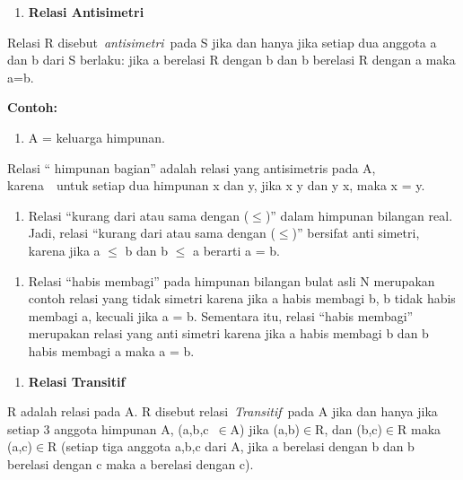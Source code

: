 \documentclass[11pt,fleqn]{book} %
\begin{document}
\noindent \textbf{}

\begin{enumerate}
\item \textbf{ Relasi Antisimetri}
\end{enumerate}

\noindent Relasi R disebut~\textit{antisimetri}~pada S jika dan hanya jika setiap dua anggota a dan b dari S berlaku: jika a berelasi R dengan b dan b berelasi R dengan a maka a=b.

\noindent \textbf{Contoh:}

\begin{enumerate}
\item \textbf{ }A = keluarga himpunan. 
\end{enumerate}

\noindent Relasi `` himpunan bagian'' adalah relasi yang antisimetris pada A, karena~~untuk setiap dua himpunan x dan y, jika x y dan y x, maka x = y.

\begin{enumerate}
\item  Relasi ``kurang dari atau sama dengan ($\mathrm{\le}$)'' dalam himpunan bilangan real. Jadi, relasi ``kurang dari atau sama dengan ($\mathrm{\le}$)'' bersifat anti simetri, karena jika a $\mathrm{\le}$ b dan b $\mathrm{\le}$ a berarti a = b.
\end{enumerate}

\noindent 

\begin{enumerate}
\item  Relasi ``habis membagi'' pada himpunan bilangan bulat asli N merupakan contoh relasi yang tidak simetri karena jika a habis membagi b, b tidak habis membagi a, kecuali jika a = b. Sementara itu, relasi ``habis membagi'' merupakan relasi yang anti simetri karena jika a habis membagi b dan b habis membagi a maka a = b.
\end{enumerate}

\noindent 

\begin{enumerate}
\item  \textbf{Relasi Transitif}
\end{enumerate}

\noindent 

\noindent R adalah relasi pada A. R disebut relasi~\textit{Transitif}~pada A jika dan hanya jika setiap 3 anggota himpunan A, (a,b,c~$\mathrm{\in }$A) jika (a,b)$\mathrm{\in }$R, dan (b,c)$\mathrm{\in }$R maka (a,c)$\mathrm{\in }$R (setiap tiga anggota a,b,c dari A, jika a berelasi dengan b dan b berelasi dengan c maka a berelasi dengan c).
\end{document}
